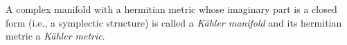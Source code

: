 A complex manifold with a hermitian metric whose imaginary part is a closed form (i.e., a symplectic structure) is called a \textit{K\"ahler manifold} and its hermitian metric a \textit{K\"ahler metric}.
